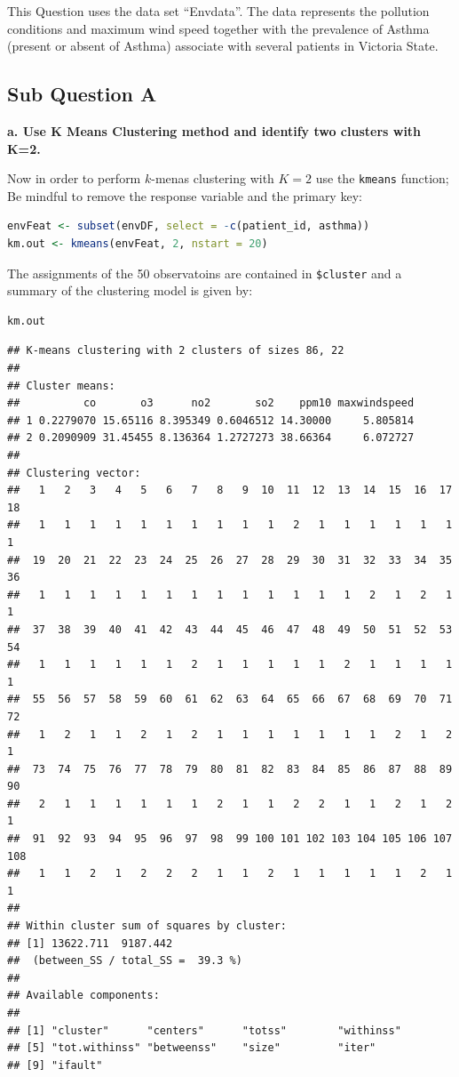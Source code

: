 \documentclass[
]{article}
\newcommand{\passthrough}[1]{#1}
\begin{document}
This Question uses the data set ``Envdata''. The data represents the
pollution conditions and maximum wind speed together with the prevalence
of Asthma (present or absent of Asthma) associate with several patients
in Victoria State.

\hypertarget{sub-question-a}{%
\subsection{Sub Question A}\label{sub-question-a}}

\textbf{a. Use K Means Clustering method and identify two clusters with
K=2.}

Now in order to perform \(k\)-menas clustering with \(K=2\) use the
\passthrough{\lstinline!kmeans!} function; Be mindful to remove the
response variable and the primary key:

\begin{lstlisting}[language=R]
envFeat <- subset(envDF, select = -c(patient_id, asthma))
km.out <- kmeans(envFeat, 2, nstart = 20)
\end{lstlisting}

The assignments of the 50 observatoins are contained in
\passthrough{\lstinline!$cluster!} and a summary of the clustering model
is given by:

\begin{lstlisting}[language=R]
km.out
\end{lstlisting}

\begin{lstlisting}
## K-means clustering with 2 clusters of sizes 86, 22
## 
## Cluster means:
##          co       o3      no2       so2    ppm10 maxwindspeed
## 1 0.2279070 15.65116 8.395349 0.6046512 14.30000     5.805814
## 2 0.2090909 31.45455 8.136364 1.2727273 38.66364     6.072727
## 
## Clustering vector:
##   1   2   3   4   5   6   7   8   9  10  11  12  13  14  15  16  17  18 
##   1   1   1   1   1   1   1   1   1   1   2   1   1   1   1   1   1   1 
##  19  20  21  22  23  24  25  26  27  28  29  30  31  32  33  34  35  36 
##   1   1   1   1   1   1   1   1   1   1   1   1   1   2   1   2   1   1 
##  37  38  39  40  41  42  43  44  45  46  47  48  49  50  51  52  53  54 
##   1   1   1   1   1   1   2   1   1   1   1   1   2   1   1   1   1   1 
##  55  56  57  58  59  60  61  62  63  64  65  66  67  68  69  70  71  72 
##   1   2   1   1   2   1   2   1   1   1   1   1   1   1   2   1   2   1 
##  73  74  75  76  77  78  79  80  81  82  83  84  85  86  87  88  89  90 
##   2   1   1   1   1   1   1   2   1   1   2   2   1   1   2   1   2   1 
##  91  92  93  94  95  96  97  98  99 100 101 102 103 104 105 106 107 108 
##   1   1   2   1   2   2   2   1   1   2   1   1   1   1   1   2   1   1 
## 
## Within cluster sum of squares by cluster:
## [1] 13622.711  9187.442
##  (between_SS / total_SS =  39.3 %)
## 
## Available components:
## 
## [1] "cluster"      "centers"      "totss"        "withinss"    
## [5] "tot.withinss" "betweenss"    "size"         "iter"        
## [9] "ifault"
\end{lstlisting}
\end{document}
